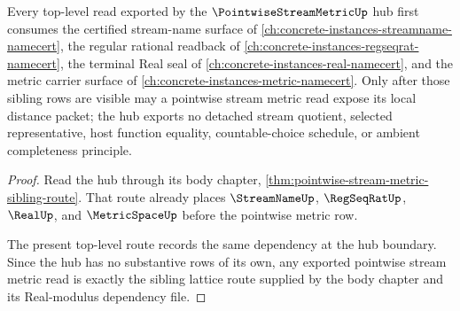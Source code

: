 \begin{theorem}
\label{thm:pointwise-stream-metric-top-level-sibling-lattice-route}
Every top-level read exported by the $\PointwiseStreamMetricUp$ hub first consumes the certified stream-name surface of \autoref{ch:concrete-instances-streamname-namecert}, the regular rational readback of \autoref{ch:concrete-instances-regseqrat-namecert}, the terminal Real seal of \autoref{ch:concrete-instances-real-namecert}, and the metric carrier surface of \autoref{ch:concrete-instances-metric-namecert}. Only after those sibling rows are visible may a pointwise stream metric read expose its local distance packet; the hub exports no detached stream quotient, selected representative, host function equality, countable-choice schedule, or ambient completeness principle.
\end{theorem}
\begin{proof}
Read the hub through its body chapter, \autoref{thm:pointwise-stream-metric-sibling-route}. That route already places $\StreamNameUp$, $\RegSeqRatUp$, $\RealUp$, and $\MetricSpaceUp$ before the pointwise metric row.

The present top-level route records the same dependency at the hub boundary. Since the hub has no substantive rows of its own, any exported pointwise stream metric read is exactly the sibling lattice route supplied by the body chapter and its Real-modulus dependency file.
\end{proof}
